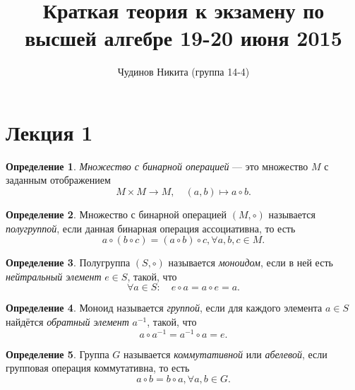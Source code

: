 \documentclass[a4paper]{article}
\theoremstyle{plain}
\theoremstyle{definition}
\newtheorem{definition}{Определение}
\numberwithin{definition}{section}
\numberwithin{proposal}{section}
\begin{document}
\sloppy
\author{Чудинов Никита (группа 14-4)}
\date{}
\title{\vspace{-1.7cm}Краткая теория к экзамену по высшей алгебре 19-20 июня 2015}
\frenchspacing

\maketitle

\section{Лекция 1}

\begin{definition}
\emph{Множество с бинарной операцией} --- это множество \(M\) с заданным отображением
\begin{equation*}
	M \times M \rightarrow M, \quad (a, b) \mapsto a \circ b.
\end{equation*}
\end{definition}

\begin{definition}
Множество с бинарной операцией \((M, \circ)\) называется \emph{полугруппой}, если данная бинарная операция ассоциативна, то есть
\begin{equation*}
	a \circ (b \circ c) = (a \circ b) \circ c, \forall a,b,c \in M.
\end{equation*}
\end{definition}

\begin{definition}
Полугруппа \((S, \circ)\) называется \emph{моноидом}, если в ней есть \emph{нейтральный элемент} \(e \in S\), такой, что
\begin{equation*}
	\forall a \in S: \quad e \circ a = a \circ e = a.
\end{equation*}
\end{definition}

\begin{definition}
Моноид называется \emph{группой}, если для каждого элемента \(a \in S\) найдётся \emph{обратный элемент} \(a^{-1}\), такой, что
\begin{equation*}
	a \circ a^{-1} = a^{-1} \circ a = e.
\end{equation*}
\end{definition}

\begin{definition}
Группа \(G\) называется \emph{коммутативной} или \emph{абелевой}, если групповая операция коммутативна, то есть
\begin{equation*}
	a \circ b = b \circ a, \forall a, b \in G.
\end{equation*}
\end{definition}
\end{document}
